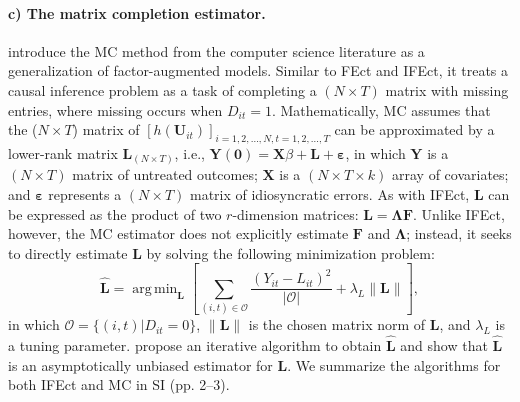 \documentclass[12pt]{article}
\DeclareMathOperator*{\argmin}{arg\,min}
\let\oldcenter\center
\let\oldendcenter\endcenter
\renewenvironment{center}{\setlength\topsep{0pt}\oldcenter}{\oldendcenter}
\begin{document}
\paragraph{c) The matrix completion estimator.} \citet{athey2018matrix} introduce the MC method from the computer science literature as a generalization of factor-augmented models. Similar to FEct and IFEct, it treats a causal inference problem as a task of completing a $(N \times T)$ matrix with missing entries, where missing occurs when $D_{it} = 1$. Mathematically, MC assumes that the ($N\times T$) matrix of $[h(\mathbf{U}_{it})]_{i=1,2,\hdots,N, t=1,2,\hdots,T}$ can be approximated by a lower-rank matrix $\mathbf{L}_{(N\times T)}$, i.e.,
\begin{center}
 $\mathbf{Y(0)} = \mathbf{X}\beta + \mathbf{L} + \bm{\varepsilon}$,
\end{center}
in which $\mathbf{Y}$ is a $(N\times T)$ matrix of untreated outcomes; $\mathbf{X}$ is a $(N\times T\times k)$ array of covariates; and  $\bm{\varepsilon}$ represents a $(N\times T)$ matrix of idiosyncratic errors. As with IFEct, $\mathbf{L}$ can be expressed as the product of two $r$-dimension matrices: $\mathbf{L}  = \mathbf{\Lambda} \mathbf{F}$. Unlike IFEct, however, the MC estimator does not explicitly estimate $\mathbf{F}$ and $\mathbf{\Lambda}$; instead, it seeks to directly estimate $\mathbf{L}$ by solving the following minimization problem:
\begin{equation*}
\mathbf{\widehat{L}} = \argmin_{\mathbf{L}} \left[ \sum_{(i,t) \in \mathcal{O}} \frac{(Y_{it} - L_{it})^2}{|\mathcal{O}|} + \lambda_{L} \|\mathbf{L}\| \right],
\end{equation*}
in which $\mathcal{O} = \{(i,t)| D_{it} = 0\}$, $\|\mathbf{L}\|$ is the chosen matrix norm of $\mathbf{L}$, and $\lambda_{L}$ is a tuning parameter. \citet{athey2018matrix} propose an iterative algorithm to obtain $\mathbf{\widehat{L}}$ and show that $\mathbf{\widehat{L}}$ is an asymptotically unbiased estimator for $\mathbf{L}$. We summarize the algorithms for both IFEct and MC in SI (pp. 2--3). 
\end{document}

